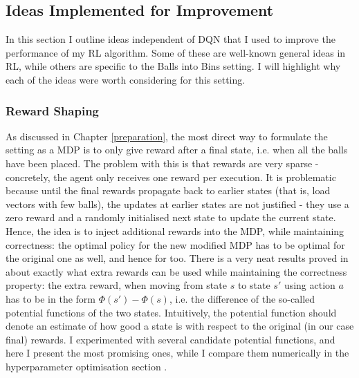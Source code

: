 \subsection{Ideas Implemented for Improvement} \label{improvementideas}


In this section I outline ideas independent of DQN that I used to improve the performance of my RL algorithm. Some of these are well-known general ideas in RL, while others are specific to the \TwoThinning Balls into Bins setting. I will highlight why each of the ideas were worth considering for this setting.


\subsubsection{Reward Shaping} \label{rewardshaping}

As discussed in Chapter \ref{preparation}, the most direct way to formulate the \TwoThinning setting as a MDP is to only give reward after a final state, i.e. when all the balls have been placed. The problem with this is that rewards are very sparse - concretely, the agent only receives one reward per execution. It is problematic because until the final rewards propagate back to earlier states (that is, load vectors with few balls), the updates at earlier states are not justified - they use a zero reward and a randomly initialised next state to update the current state. Hence, the idea is to inject additional rewards into the MDP, while maintaining correctness: the optimal policy for the new modified MDP has to be optimal for the original one as well, and hence for \TwoThinning too. There is a very neat results proved in \cite{ng1999rewardshaping} about exactly what extra rewards can be used while maintaining the correctness property: the extra reward, when moving from state $s$ to state $s'$ using action $a$ has to be in the form $\Phi(s')-\Phi(s)$, i.e. the difference of the so-called potential functions of the two states. Intuitively, the potential function should denote an estimate of how good a state is with respect to the original (in our case final) rewards. I experimented with several candidate potential functions, and here I present the most promising ones, while I compare them numerically in the hyperparameter optimisation section .

